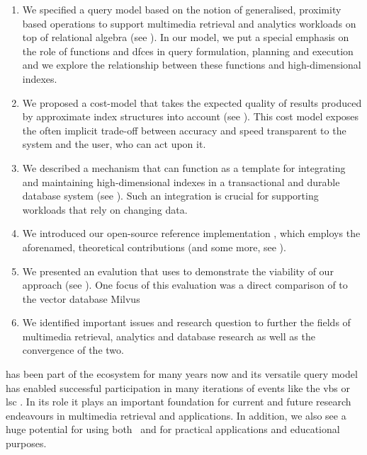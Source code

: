\begin{enumerate}
    \item We specified a query model based on the notion of generalised, proximity based operations to support multimedia retrieval and analytics workloads on top of relational algebra (see ). In our model, we put a special emphasis on the role of functions and \acrlong{dfc}es in query formulation, planning and execution and we explore the relationship between these functions and high-dimensional indexes.
    \item We proposed a cost-model that takes the expected quality of results produced by approximate index structures into account (see ). This cost model exposes the often implicit trade-off between accuracy and speed transparent to the system and the user, who can act upon it.
    \item We described a mechanism that can function as a template for integrating and maintaining high-dimensional indexes in a transactional and durable database system (see ). Such an integration is crucial for supporting workloads that rely on changing data.
    \item We introduced our open-source reference implementation \cottontail{}, which employs the aforenamed, theoretical contributions (and some more, see ). 
    \item We presented an evalution that uses \cottontail{} to demonstrate the viability of our approach (see ). One focus of this evaluation was a direct comparison of \cottontail{} to the vector database Milvus \cite{Wang:2021Milvus} 
    \item We identified important issues and research question to further the fields of multimedia retrieval, analytics and database research as well as the convergence of the two.
\end{enumerate}

\cottontail{} has been part of the \vitrivr{} ecosystem \cite{Rossetto:2016Vitrivr,Gasser:2019Multimodal} for many years now and its versatile query model has enabled successful participation in many iterations of events like the \acrshort{vbs} \cite{Rossetto:2019Deep,Sauter2020:Combining,Spiess2021:Competitive,Heller:2022Multi} or \acrshort{lsc} \cite{Spiess2021:Exploring,Heller2020:Interactive,Heller2021:Interactive,Spiess:2022Multi}. In its role it plays an important foundation for current and future research endeavours in multimedia retrieval and applications. In addition, we also see a huge potential for using both \vitrivr{} and \cottontail{} for practical applications and educational purposes.

